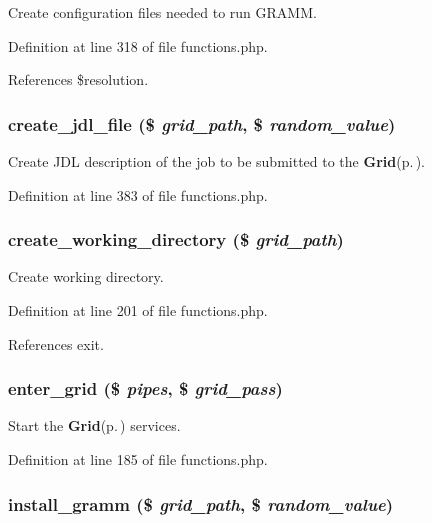Create configuration files needed to run GRAMM. 



Definition at line 318 of file functions.php.

References \$resolution.
\subsubsection{\setlength{\rightskip}{0pt plus 5cm}create\_\-jdl\_\-file (\$ {\em grid\_\-path}, \$ {\em random\_\-value})}\label{functions_8php_a9}


Create JDL description of the job to be submitted to the {\bf Grid}{\rm (p.\,\pageref{classGrid})}. 



Definition at line 383 of file functions.php.
\subsubsection{\setlength{\rightskip}{0pt plus 5cm}create\_\-working\_\-directory (\$ {\em grid\_\-path})}\label{functions_8php_a4}


Create working directory. 



Definition at line 201 of file functions.php.

References exit.
\subsubsection{\setlength{\rightskip}{0pt plus 5cm}enter\_\-grid (\$ {\em pipes}, \$ {\em grid\_\-pass})}\label{functions_8php_a3}


Start the {\bf Grid}{\rm (p.\,\pageref{classGrid})} services. 



Definition at line 185 of file functions.php.
\subsubsection{\setlength{\rightskip}{0pt plus 5cm}install\_\-gramm (\$ {\em grid\_\-path}, \$ {\em random\_\-value})}\label{functions_8php_a2}


